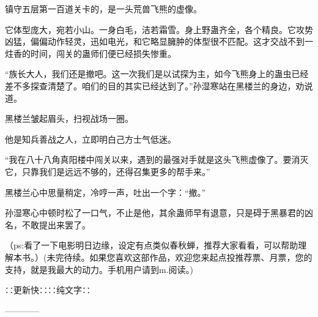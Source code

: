 \begin{this_body}
镇守五层第一百道关卡的，是一头荒兽飞熊的虚像。

它体型庞大，宛若小山。一身白毛，洁若霜雪。身上野蛊齐全，各个精良。它攻势凶猛，偏偏动作轻灵，迅如电光，和它略显臃肿的体型很不匹配。这才交战不到一炷香的时间，闯关的蛊师们便已经损失惨重。

“族长大人，我们还是撤吧。这一次我们是以试探为主，如今飞熊身上的蛊虫已经差不多探查清楚了。咱们的目的其实已经达到了。”孙湿寒站在黑楼兰的身边，劝说道。

黑楼兰皱起眉头，扫视战场一圈。

他是知兵善战之人，立即明白己方士气低迷。

“我在八十八角真阳楼中闯关以来，遇到的最强对手就是这头飞熊虚像了。要消灭它，只靠我们是远远不够的，还得召集更多的帮手来。”

黑楼兰心中思量稍定，冷哼一声，吐出一个字：“撤。”

孙湿寒心中顿时松了一口气，不止是他，其余蛊师早有退意，只是碍于黑暴君的凶名，不敢提出来罢了。

（ps:看了一下电影明日边缘，设定有点类似春秋蝉，推荐大家看看，可以帮助理解本书。）(未完待续。如果您喜欢这部作品，欢迎您来起点投推荐票、月票，您的支持，就是我最大的动力。手机用户请到m.阅读。)

∷更新快∷∷纯文字∷

------------

\end{this_body}

